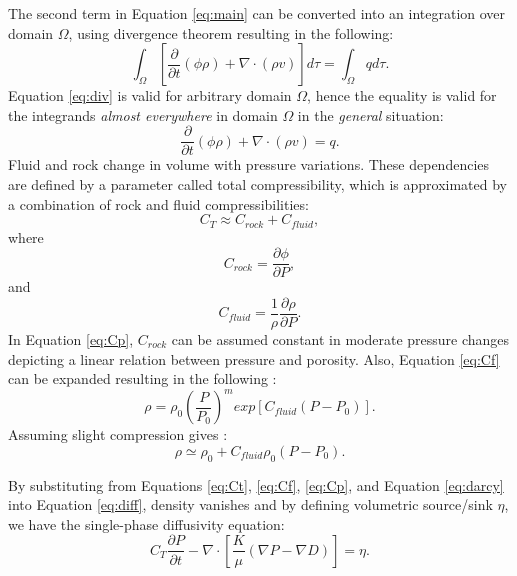 The second term in Equation \ref{eq:main} can be converted into an integration
over domain $\Omega$, using divergence theorem resulting in the following:
\begin{equation}
  \int_{\Omega}[\frac{\partial}{\partial t}(\phi\rho)+\nabla \cdot (\rho
v)]d\tau=\int_{\Omega}qd\tau.
  \label{eq:div}
\end{equation} Equation \ref{eq:div} is valid for arbitrary domain $\Omega$,
hence the equality is valid for the integrands \textit{almost everywhere} in
domain $\Omega$ in the \textit{general} situation:
\begin{equation}
 \frac{\partial}{\partial t}(\phi\rho)+\nabla \cdot (\rho v)=q.
 \label{eq:diff}
\end{equation}
Fluid and rock change in volume with pressure variations. These dependencies are
defined by a parameter called total compressibility, which is approximated by a
combination of rock and fluid compressibilities:
\begin{equation}
  C_{T}\approx C_{rock}+C_{fluid},
  \label{eq:Ct}
\end{equation} where
\begin{equation}
  C_{rock}=\frac{\partial \phi}{\partial P},
  \label{eq:Cp}
\end{equation} and
\begin{equation}
  C_{fluid}=\frac{1}{\rho} \frac{\partial \rho}{\partial P}.
  \label{eq:Cf}
\end{equation} In Equation \ref{eq:Cp}, $C_{rock}$ can be assumed constant in
moderate pressure changes depicting a linear relation between pressure and
porosity. Also, Equation \ref{eq:Cf} can be expanded resulting in the following
\cite{muskatflow}:
\begin{equation}
 \rho=\rho_0 (\frac{P}{P_0})^m exp[C_{fluid}(P-P_0)].
 \label{eq:Cexp}
\end{equation} Assuming slight compression gives \cite{sahimi2011flow}:
\begin{equation}
 \rho \simeq \rho_0 + C_{fluid} \rho_0 (P-P_0).
 \label{eq:Cslg}
\end{equation}

By substituting from Equations \ref{eq:Ct}, \ref{eq:Cf}, \ref{eq:Cp}, and
Equation \ref{eq:darcy} into Equation \ref{eq:diff}, density vanishes and by
defining volumetric source/sink $\eta$, we have the single-phase diffusivity
equation:
\begin{equation}
 C_T \frac{\partial P}{\partial t}-\nabla \cdot [\frac{K}{\mu} (\nabla P -
\nabla D)] = \eta.
 \label{eq:vol}
\end{equation}

